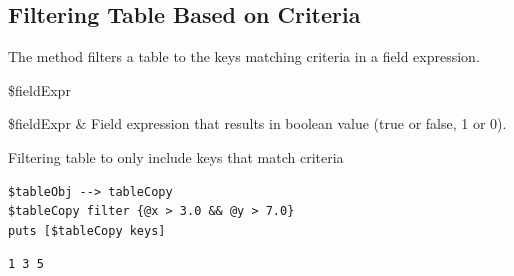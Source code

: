 \subsection{Filtering Table Based on Criteria}
The method  filters a table to the keys matching criteria in a field expression. 
\begin{syntax}
 \$fieldExpr
\end{syntax}
\begin{args}
\$fieldExpr & Field expression that results in boolean value (true or false, 1 or 0).
\end{args}
\begin{example}{Filtering table to only include keys that match criteria}
\begin{lstlisting}
$tableObj --> tableCopy
$tableCopy filter {@x > 3.0 && @y > 7.0}
puts [$tableCopy keys]
\end{lstlisting}
\tcblower
\begin{lstlisting}
1 3 5
\end{lstlisting}
\end{example}

\clearpage

